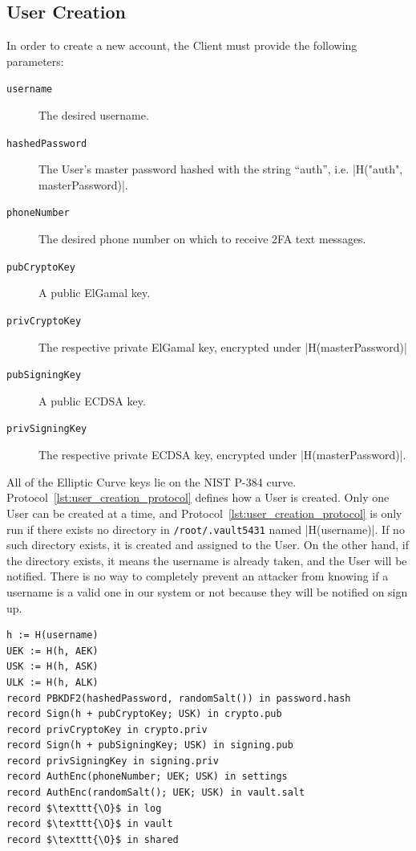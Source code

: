 \documentclass{article}
\begin{document}
\subsection{User Creation}
\label{sub:user_creation}
\par In order to create a new account, the Client must provide the following parameters:
\begin{description}
  \item[\texttt{username}] The desired username.
  \item[\texttt{hashedPassword}] The User's master password hashed with the string ``auth'', i.e. |H("auth", masterPassword)|.
  \item[\texttt{phoneNumber}] The desired phone number on which to receive 2FA text messages.
  \item[\texttt{pubCryptoKey}] A public ElGamal key.
  \item[\texttt{privCryptoKey}] The respective private ElGamal key, encrypted under |H(masterPassword)|
  \item[\texttt{pubSigningKey}] A public ECDSA key.
  \item[\texttt{privSigningKey}] The respective private ECDSA key, encrypted under |H(masterPassword)|.
\end{description}
\par All of the Elliptic Curve keys lie on the NIST P-384 curve. Protocol~\ref{lst:user_creation_protocol} defines how a User is created. Only one User can be created at a time, and Protocol~\ref{lst:user_creation_protocol} is only run if there exists no directory in \texttt{/root/.vault5431} named |H(username)|. If no such directory exists, it is created and assigned to the User. On the other hand, if the directory exists, it means the username is already taken, and the User will be notified. There is no way to completely prevent an attacker from knowing if a username is a valid one in our system or not because they will be notified on sign up.
\begin{lstlisting}[caption={User Creation Protocol},label={lst:user_creation_protocol},style=Pseudocode]
h := H(username)
UEK := H(h, AEK)
USK := H(h, ASK)
ULK := H(h, ALK)
record PBKDF2(hashedPassword, randomSalt()) in password.hash
record Sign(h + pubCryptoKey; USK) in crypto.pub
record privCryptoKey in crypto.priv
record Sign(h + pubSigningKey; USK) in signing.pub
record privSigningKey in signing.priv
record AuthEnc(phoneNumber; UEK; USK) in settings
record AuthEnc(randomSalt(); UEK; USK) in vault.salt
record $\texttt{\O}$ in log
record $\texttt{\O}$ in vault
record $\texttt{\O}$ in shared
\end{lstlisting}
\end{document}
